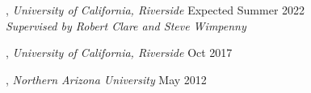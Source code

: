 , \textit{University of California, Riverside}	\hfill Expected Summer 2022 \\
\textit{Supervised by Robert Clare and Steve Wimpenny}

, \textit{University of California, Riverside}	\hfill Oct 2017

, \textit{Northern Arizona University} \hfill	May 2012



